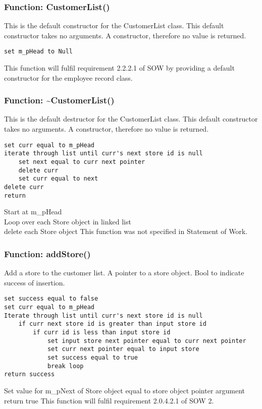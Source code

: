 \documentclass[12pt]{article}%
\newcounter{subsubsubsection}[subsubsection]
\begin{document}
\subsubsection{Function: CustomerList()}
This is the default constructor for the CustomerList class.
This default constructor takes no arguments.
A constructor, therefore no value is returned.
\begin{verbatim}
set m_pHead to Null
\end{verbatim}
This function will fulfil requirement 2.2.2.1 of SOW by providing a default constructor for the
employee record class.

\subsubsection{Function: \textasciitilde CustomerList()}
This is the default destructor for the CustomerList class.
This default constructor takes no arguments.
A constructor, therefore no value is returned.
\begin{verbatim}
set curr equal to m_pHead
iterate through list until curr's next store id is null
    set next equal to curr next pointer
    delete curr
    set curr equal to next
delete curr
return
\end{verbatim}
Start at m\_pHead \\
Loop over each Store object in linked list \\
delete each Store object
This function was not specified in Statement of Work.

\subsubsection{Function: addStore()}
Add a store to the customer list.
A pointer to a store object.
Bool to indicate success of insertion.
\begin{verbatim}
set success equal to false
set curr equal to m_pHead
Iterate through list until curr's next store id is null
    if curr next store id is greater than input store id
        if curr id is less than input store id
            set input store next pointer equal to curr next pointer
            set curr next pointer equal to input store
            set success equal to true
            break loop
return success
\end{verbatim}
Set value for m\_pNext of Store object equal to store object pointer argument \\
return true
This function will fulfil requirement 2.0.4.2.1 of SOW 2.
\end{document}
